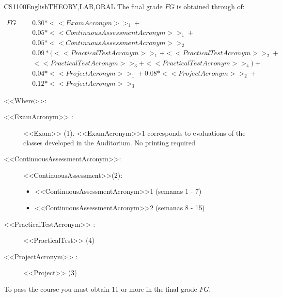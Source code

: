     \begin{evaluation}{CS1100}{English}{THEORY,LAB,ORAL}
    The final grade $FG$ is obtained through of:
    
    \begin{equation}
       \begin{split}
       FG  =~ & 0.30*<<ExamAcronym>>_{1}  +\\
                  &  0.05*<<ContinuousAssessmentAcronym>>_{1} + \\
                  &  0.05*<<ContinuousAssessmentAcronym>>_{2}  \\
                    & 0.09*(<<PracticalTestAcronym>>_{1} + <<PracticalTestAcronym>>_{2} + \\
                  & <<PracticalTestAcronym>>_{3} + <<PracticalTestAcronym>>_{4}) + \\
                   & 0.04*<<ProjectAcronym>>_{1} + 0.08*<<ProjectAcronym>>_{2} + \\
                 & 0.12*<<ProjectAcronym>>_{3}
       \end{split}
    \end{equation}
    
    \noindent <<Where>>:
    \begin{description}
    \item[<<ExamAcronym>> :] <<Exam>> (1). <<ExamAcronym>>1 corresponds to evaluations of the classes developed in the Auditorium. No printing required
     \item[<<ContinuousAssessmentAcronym>>:]<<ContinuousAssessment>>(2):
        \begin{itemize}
               \item <<ContinuousAssessmentAcronym>>1 (semanas 1 - 7)  
               \item <<ContinuousAssessmentAcronym>>2 (semanas 8 - 15)
         \end{itemize}
    \item[<<PracticalTestAcronym>> :] <<PracticalTest>> (4)
    \item[<<ProjectAcronym>> :] <<Project>> (3)
    \end{description}
    
    \noindent To pass the course you must obtain 11 or more in the final grade $FG$.
    \end{evaluation}
    
    
    
